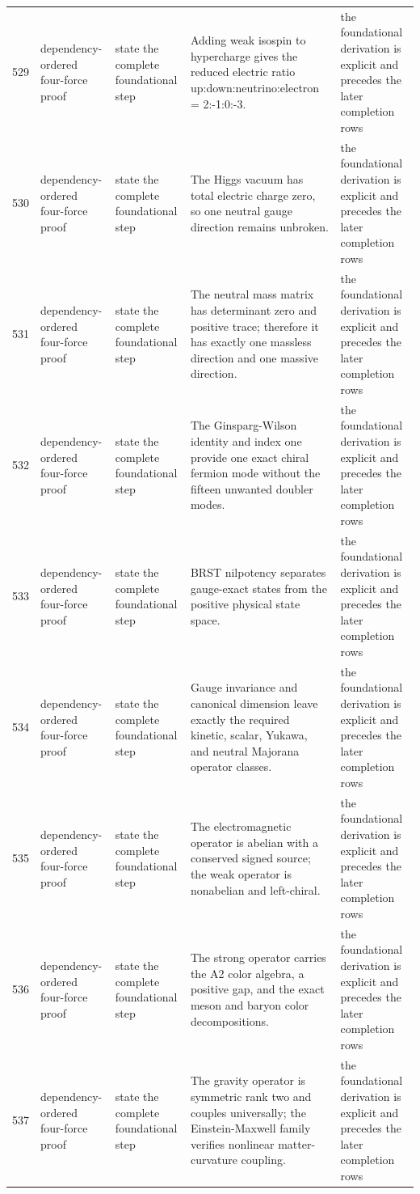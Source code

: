 \documentclass[11pt]{article}
\numberwithin{equation}{section}
\theoremstyle{remark}
\begin{document}
\begin{landscape}
\begin{longtable}{p{0.65cm}p{3.5cm}p{4.0cm}p{4.0cm}p{4.6cm}}
529&dependency-ordered four-force proof&state the complete foundational step&Adding weak isospin to hypercharge gives the reduced electric ratio up:down:neutrino:electron = 2:-1:0:-3.&the foundational derivation is explicit and precedes the later completion rows\\
530&dependency-ordered four-force proof&state the complete foundational step&The Higgs vacuum has total electric charge zero, so one neutral gauge direction remains unbroken.&the foundational derivation is explicit and precedes the later completion rows\\
531&dependency-ordered four-force proof&state the complete foundational step&The neutral mass matrix has determinant zero and positive trace; therefore it has exactly one massless direction and one massive direction.&the foundational derivation is explicit and precedes the later completion rows\\
532&dependency-ordered four-force proof&state the complete foundational step&The Ginsparg-Wilson identity and index one provide one exact chiral fermion mode without the fifteen unwanted doubler modes.&the foundational derivation is explicit and precedes the later completion rows\\
533&dependency-ordered four-force proof&state the complete foundational step&BRST nilpotency separates gauge-exact states from the positive physical state space.&the foundational derivation is explicit and precedes the later completion rows\\
534&dependency-ordered four-force proof&state the complete foundational step&Gauge invariance and canonical dimension leave exactly the required kinetic, scalar, Yukawa, and neutral Majorana operator classes.&the foundational derivation is explicit and precedes the later completion rows\\
535&dependency-ordered four-force proof&state the complete foundational step&The electromagnetic operator is abelian with a conserved signed source; the weak operator is nonabelian and left-chiral.&the foundational derivation is explicit and precedes the later completion rows\\
536&dependency-ordered four-force proof&state the complete foundational step&The strong operator carries the A2 color algebra, a positive gap, and the exact meson and baryon color decompositions.&the foundational derivation is explicit and precedes the later completion rows\\
537&dependency-ordered four-force proof&state the complete foundational step&The gravity operator is symmetric rank two and couples universally; the Einstein-Maxwell family verifies nonlinear matter-curvature coupling.&the foundational derivation is explicit and precedes the later completion rows\\

\end{longtable}
\end{landscape}
\end{document}
